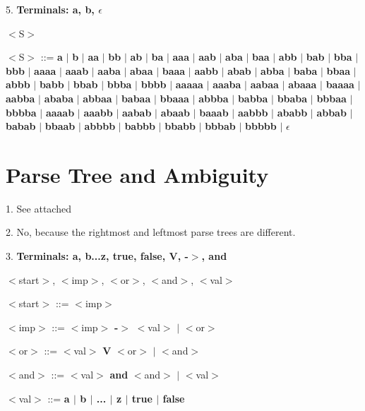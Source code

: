 \documentclass[11pt]{article}
\begin{document}
\vspace{5mm}

5. {\bf Terminals: a, b, $\epsilon$}

	 $<$S$>$


	\indent\indent $<$S$>$ ::= 
{\bf a} $|$ {\bf b} $|$ {\bf aa} $|$ {\bf bb} $|$ {\bf ab} $|$ {\bf ba} $|$ 
{\bf aaa} $|$ {\bf aab} $|$ {\bf aba} $|$ {\bf baa} $|$ {\bf abb} $|$ {\bf bab} 
$|$ {\bf bba} $|$ {\bf bbb} $|$ {\bf aaaa} $|$ {\bf aaab} $|$ {\bf aaba} $|$ 
{\bf abaa} $|$ {\bf baaa} $|$ {\bf aabb} $|$ {\bf abab} $|$ {\bf abba} $|$ 
{\bf baba} $|$ {\bf bbaa} $|$ {\bf abbb} $|$ {\bf babb} $|$ {\bf bbab} $|$ 
{\bf bbba} $|$ {\bf bbbb} $|$ {\bf aaaaa} $|$ {\bf aaaba} $|$ {\bf aabaa} $|$ 
{\bf abaaa} $|$ {\bf baaaa} $|$ {\bf aabba} $|$ {\bf ababa} $|$ {\bf abbaa} $|$ 
{\bf babaa} $|$ {\bf bbaaa} $|$ {\bf abbba} $|$ {\bf babba} $|$ {\bf bbaba} $|$ 
{\bf bbbaa} $|$ {\bf bbbba} $|$ {\bf aaaab} $|$ {\bf aaabb} $|$ {\bf aabab} $|$ 
{\bf abaab} $|$ {\bf baaab} $|$ {\bf aabbb} $|$ {\bf ababb} $|$ {\bf abbab} $|$ 
{\bf babab} $|$ {\bf bbaab} $|$ {\bf abbbb} $|$ {\bf babbb} $|$ {\bf bbabb} $|$ 
{\bf bbbab} $|$ {\bf bbbbb} $|$ $\epsilon$

\section{Parse Tree and Ambiguity}
1. See attached

2. No, because the rightmost and leftmost parse trees are different.

3. {\bf Terminals: a, b...z, true, false, V, -$>$, and}

	 $<$start$>$, $<$imp$>$, $<$or$>$, $<$and$>$, $<$val$>$


	\indent\indent $<$start$>$ ::= $<$imp$>$

	\indent\indent $<$imp$>$ ::= $<$imp$>$ {\bf -$>$} $<$val$>$ $|$ $<$or$>$

	\indent\indent $<$or$>$ ::= $<$val$>$ {\bf V} $<$or$>$ $|$ $<$and$>$

	\indent\indent $<$and$>$ ::= $<$val$>$ {\bf and} $<$and$>$ $|$ $<$val$>$

	\indent\indent $<$val$>$ ::= {\bf a $|$ b $|$ ... $|$ z $|$ true $|$ false}
\end{document}
